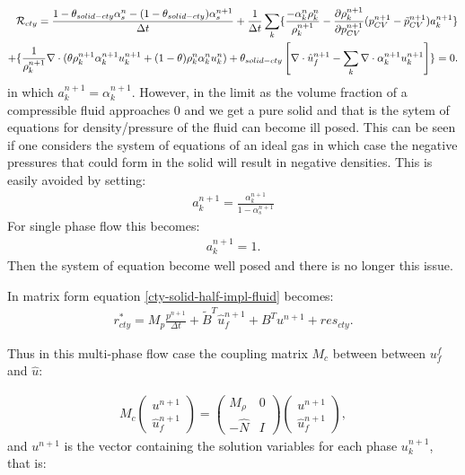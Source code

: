 \begin{eqnarray}
{\cal{R}}_{cty} =\frac{1-\theta_{solid-cty}\alpha_s^n  -(1-\theta_{solid-cty})\alpha_s^{n+1} }{\Delta t} + 
\frac{1}{\Delta t} \sum_k\{ 
\frac{  - \alpha_k^n\rho_k^{n}} {\rho_k^{n+1}} 
-  \frac{\partial \rho_k^{n+1}}{\partial p_{CV}^{n+1}} (p_{CV}^{n+1}-\tilde{p}_{CV}^{n+1}) a_k^{n+1} \}
\\
+ 
\{ 
\frac{1}{\rho_k^{n+1} } \nabla\cdot (\theta \rho_k^{n+1} \alpha_k^{n+1} u_k^{n+1}+(1-\theta) \rho_k^{n} \alpha_k^{n} u_k^{n}) 
+\theta_{solid-cty}\left[ \nabla\cdot\hat u_f^{n+1} - \sum_k \nabla\cdot \alpha_k^{n+1} u_k^{n+1} \right] \} 
=0. 
\label{cty-solid-half-impl-fluid} 
\end{eqnarray} 
in which $a_k^{n+1}=\alpha_k^{n+1}$. 
However, in the limit as the volume fraction of a compressible 
fluid approaches 0 and we get a pure solid and that is the sytem of equations for density/pressure 
of the fluid can become ill posed. This can be seen if one considers the system of equations of an ideal gas 
in which case the negative pressures that could form in the solid will result in negative densities. This is easily 
avoided by setting: 
\begin{eqnarray}
a_k^{n+1}=\frac{\alpha_k^{n+1}}{1-\alpha_s^{n+1}}
\label{a-1} 
\end{eqnarray} 
For single phase flow this becomes: 
\begin{eqnarray}
a_k^{n+1}=1. 
\label{a-2} 
\end{eqnarray} 
Then the system of equation become well posed and there is no longer this issue. 





In matrix form equation \ref{cty-solid-half-impl-fluid} becomes: 
\begin{eqnarray}
{r}_{cty}^* =M_p \frac{p^{n+1}}{\Delta t} + \tilde B^T \hat u_f^{n+1} + B^T u^{n+1} + res_{cty} . 
\end{eqnarray} 

Thus in this multi-phase flow case the coupling matrix $M_c$ between between $u_f^f$ and $\hat u$: 

\begin{eqnarray}
M_c 
\begin{pmatrix}
u^{n+1} \\ \hat u_f^{n+1}
\end{pmatrix}  
=
\begin{pmatrix}
M_\rho  & 0 \\ 
-\hat N  & I 
\end{pmatrix} 
\begin{pmatrix}
u^{n+1} \\ \hat u_f^{n+1} 
\end{pmatrix}  , 
\end{eqnarray}
and $u^{n+1}$ is the vector containing the solution variables for each phase $u_k^{n+1}$, that is: 

